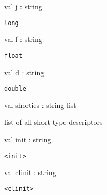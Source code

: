 \documentclass[11pt]{article}
\begin{document}
\label{val:Java.j}\begin{ocamldoccode}
val j : string
\end{ocamldoccode}
\begin{ocamldocdescription}
{\tt{long}}


\end{ocamldocdescription}




\label{val:Java.f}\begin{ocamldoccode}
val f : string
\end{ocamldoccode}
\begin{ocamldocdescription}
{\tt{float}}


\end{ocamldocdescription}




\label{val:Java.d}\begin{ocamldoccode}
val d : string
\end{ocamldoccode}
\begin{ocamldocdescription}
{\tt{double}}


\end{ocamldocdescription}




\label{val:Java.shorties}\begin{ocamldoccode}
val shorties : string list
\end{ocamldoccode}
\begin{ocamldocdescription}
list of all short type descriptors


\end{ocamldocdescription}




\label{val:Java.init}\begin{ocamldoccode}
val init : string
\end{ocamldoccode}
\begin{ocamldocdescription}
{\tt{<init>}}


\end{ocamldocdescription}




\label{val:Java.clinit}\begin{ocamldoccode}
val clinit : string
\end{ocamldoccode}
\begin{ocamldocdescription}
{\tt{<clinit>}}


\end{ocamldocdescription}
\end{document}
